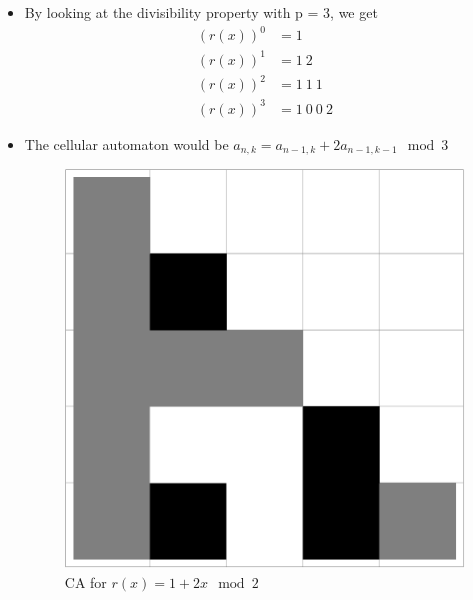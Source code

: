 \documentclass{beamer}
\begin{document}
\begin{frame}
    \begin{itemize}
        \item By looking at the divisibility property with p = 3, we get 
        \begin{align*}
            (r(x))^0 &= 1 \\
            (r(x))^1 &= 1 \ 2 \\
            (r(x))^2 &= 1 \ 1 \ 1 \\
            (r(x))^3 &= 1 \ 0 \ 0 \ 2
        \end{align*}
        \item The cellular automaton would be $a_{n,k} = a_{n-1,k} + 2a_{n-1,k-1} \mod 3$
        \begin{figure}
            \centering
            \includegraphics[scale=0.2]{Mod3Poly.pdf}
            \caption{CA for $r(x) = 1 + 2x \mod 2$}
        \end{figure}
    \end{itemize}
\end{frame}
\end{document}
